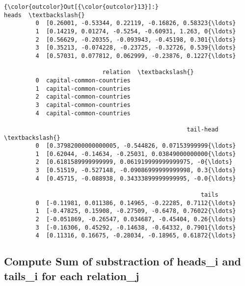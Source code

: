 \documentclass[11pt]{article}
\begin{document}
\begin{Verbatim}[commandchars=\\\{\}]
{\color{outcolor}Out[{\color{outcolor}13}]:}                                                heads  \textbackslash{}
         0  [0.26001, -0.53344, 0.22119, -0.16826, 0.58323{\ldots}   
         1  [0.14219, 0.01274, -0.5254, -0.60931, 1.263, 0{\ldots}   
         2  [0.56629, -0.20355, -0.093943, -0.45198, 0.301{\ldots}   
         3  [0.35213, -0.074228, -0.23725, -0.32726, 0.539{\ldots}   
         4  [0.57031, 0.077812, 0.062999, -0.23876, 0.1227{\ldots}   
         
                            relation  \textbackslash{}
         0  capital-common-countries   
         1  capital-common-countries   
         2  capital-common-countries   
         3  capital-common-countries   
         4  capital-common-countries   
         
                                                    tail-head  \textbackslash{}
         0  [0.37982000000000005, -0.544826, 0.07153999999{\ldots}   
         1  [0.62044, -0.14634, -0.25031, 0.03849000000000{\ldots}   
         2  [0.6181589999999999, 0.061919999999999975, -0{\ldots}   
         3  [0.51519, -0.527148, -0.09086999999999998, 0.3{\ldots}   
         4  [0.45715, -0.088938, 0.34333899999999995, -0.0{\ldots}   
         
                                                        tails  
         0  [-0.11981, 0.011386, 0.14965, -0.22285, 0.7112{\ldots}  
         1  [-0.47825, 0.15908, -0.27509, -0.6478, 0.76022{\ldots}  
         2  [-0.051869, -0.26547, 0.034687, -0.45404, 0.26{\ldots}  
         3  [-0.16306, 0.45292, -0.14638, -0.64332, 0.7901{\ldots}  
         4  [0.11316, 0.16675, -0.28034, -0.18965, 0.61872{\ldots}  
\end{Verbatim}
            
    \subsection{Compute Sum of substraction of heads\_i and tails\_i for
each
relation\_j}\label{compute-sum-of-substraction-of-heads_i-and-tails_i-for-each-relation_j}
\end{document}
